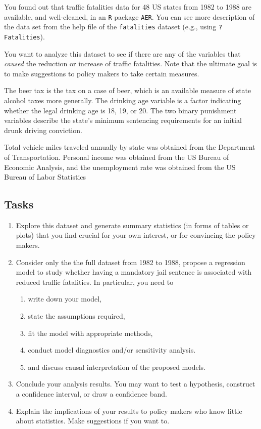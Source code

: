\documentclass[12pt,]{book}
\providecommand{\tightlist}{%
  \setlength{\itemsep}{0pt}\setlength{\parskip}{0pt}}
\begin{document}
You found out that traffic fatalities data for 48 US states from 1982 to
1988 are available, and well-cleaned, in an \texttt{R} package
\texttt{AER}. You can see more description of the data set from the help
file of the \texttt{fatalities} dataset (e.g., using
\texttt{?Fatalities}).

You want to analyze this dataset to see if there are any of the
variables that \emph{caused} the reduction or increase of traffic
fatalities. Note that the ultimate goal is to make suggestions to policy
makers to take certain measures.

The beer tax is the tax on a case of beer, which is an available measure
of state alcohol taxes more generally. The drinking age variable is a
factor indicating whether the legal drinking age is 18, 19, or 20. The
two binary punishment variables describe the state's minimum sentencing
requirements for an initial drunk driving conviction.

Total vehicle miles traveled annually by state was obtained from the
Department of Transportation. Personal income was obtained from the US
Bureau of Economic Analysis, and the unemployment rate was obtained from
the US Bureau of Labor Statistics

\subsection{Tasks}\label{tasks-2}

\begin{enumerate}
\def\labelenumi{\arabic{enumi}.}
\item
  Explore this dataset and generate summary statistics (in forms of
  tables or plots) that you find crucial for your own interest, or for
  convincing the policy makers.
\item
  Consider only the the full dataset from 1982 to 1988, propose a
  regression model to study whether having a mandatory jail sentence is
  associated with reduced traffic fatalities. In particular, you need to

  \begin{enumerate}
  \def\labelenumii{\alph{enumii}.}
  \tightlist
  \item
    write down your model,
  \item
    state the assumptions required,
  \item
    fit the model with appropriate methods,
  \item
    conduct model diagnostics and/or sensitivity analysis.
  \item
    and discuss causal interpretation of the proposed models.
  \end{enumerate}
\item
  Conclude your analysis results. You may want to test a hypothesis,
  construct a confidence interval, or draw a confidence band.
\item
  Explain the implications of your results to policy makers who know
  little about statistics. Make suggestions if you want to.
\end{enumerate}
\end{document}
